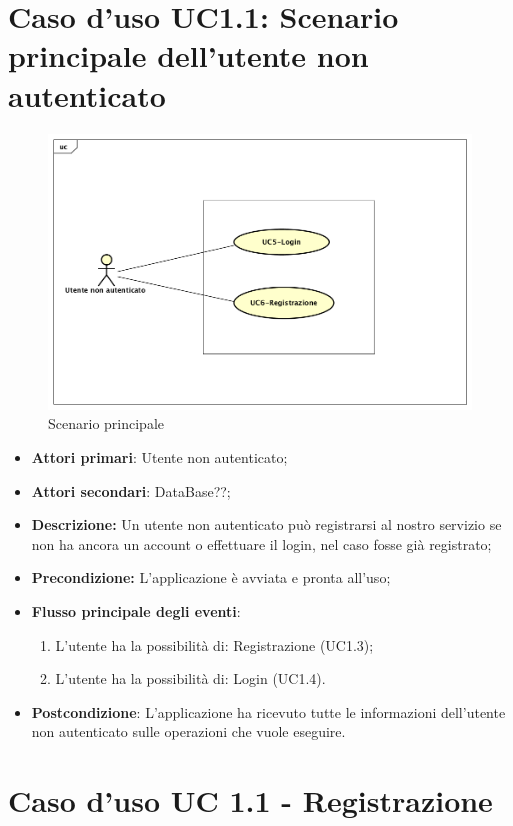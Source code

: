 \section{Caso d'uso UC1.1: Scenario principale dell'utente non autenticato}
\begin{figure}[!ht]
	\centering
	\includegraphics[scale=0.4]{Diagram/UC1.png}
	\caption{Scenario principale}\label{}
\end{figure}
\begin{itemize}
	\item \textbf{Attori primari}: Utente non autenticato;
	\item \textbf{Attori secondari}: DataBase??;
	\item \textbf{Descrizione:} Un utente non  autenticato può registrarsi al nostro servizio se non ha ancora un account o effettuare il login, nel caso fosse già registrato;
	\item \textbf{Precondizione:} L'applicazione è avviata e pronta all'uso;
	\item \textbf{Flusso principale degli eventi}:
	\begin{enumerate}
		\item L'utente ha la possibilità di: Registrazione (UC1.3);
		\item L'utente ha la possibilità di: Login (UC1.4).
	\end{enumerate}
	\item \textbf{Postcondizione}: L'applicazione ha ricevuto tutte le informazioni dell'utente non autenticato sulle operazioni che vuole eseguire.
\end{itemize}
\section{Caso d'uso UC 1.1 - Registrazione}
